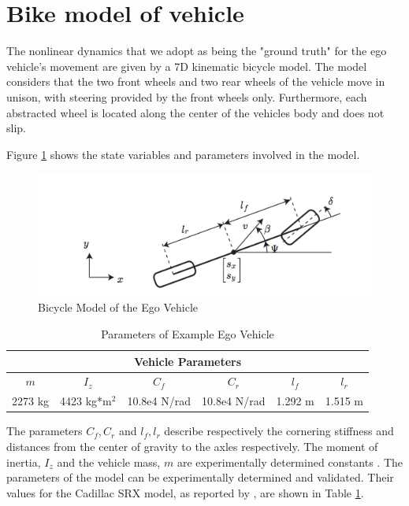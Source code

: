 \section{Bike model of vehicle}
The nonlinear dynamics that we adopt as being the "ground truth" for the ego vehicle's movement are given by a 7D kinematic bicycle model.
The model considers that the two front wheels and two rear wheels of the vehicle move in unison, with steering provided by the front wheels only. 
Furthermore, each abstracted wheel is located along the center of the vehicles body and does not slip. 

Figure \ref{fig:bike} shows the state variables and parameters involved in the model.

\begin{figure}[t]
	\centering
	\includegraphics[scale=0.5]{figures/bicycle}
	\caption{Bicycle Model of the Ego Vehicle \cite{Althoff2014}}
	\label{fig:bike}
\end{figure}

\begin{table}[h]
	\label{table:vehiclep}
	\begin{tabular}{|c|c|c|c|c|c|}
		\hline
		\multicolumn{6}{|c|}{Vehicle Parameters} \\ \hline
		\textit{$m$} & \textit{$I_z$} & \textit{$C_f$} & \textit{$C_r$} & \textit{$l_f$} & \textit{$l_r$} \\ \hline
		2273 kg & 4423 kg*m$^2$ & 10.8e4 N/rad & 10.8e4 N/rad & 1.292 m & 1.515 m \\ \hline
	\end{tabular}
	\caption{Parameters of Example Ego Vehicle}
\end{table}

The parameters \(C_f,C_r\) and \(l_f, l_r\) describe respectively the cornering stiffness and distances from the center of gravity to the axles respectively. The moment of inertia, \(I_z\) and the vehicle mass, \(m\) are experimentally determined constants \cite{Snider2009}. 
The parameters of the model can be experimentally determined and validated.
Their values for the Cadillac SRX model, as reported by \cite{Althoff2014}, are shown in Table \ref{table:vehiclep}.

